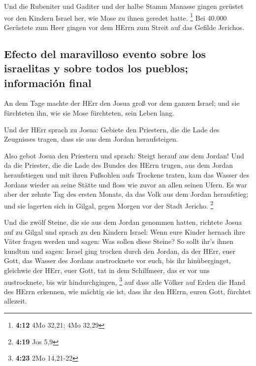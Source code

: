  Und die Rubeniter und Gaditer und der halbe Stamm
Manasse gingen gerüstet vor den Kindern Israel her, wie Mose zu ihnen
geredet hatte. \footnote{\textbf{4:12} 4Mo 32,21; 4Mo 32,29}
 Bei 40.000 Gerüstete zum Heer gingen vor dem HErrn zum
Streit auf das Gefilde Jerichos.

\hypertarget{efecto-del-maravilloso-evento-sobre-los-israelitas-y-sobre-todos-los-pueblos-informaciuxf3n-final}{%
\subsection{Efecto del maravilloso evento sobre los israelitas y sobre
todos los pueblos; información
final}\label{efecto-del-maravilloso-evento-sobre-los-israelitas-y-sobre-todos-los-pueblos-informaciuxf3n-final}}

 An dem Tage machte der HErr den Josua groß vor dem
ganzen Israel; und sie fürchteten ihn, wie sie Mose fürchteten, sein
Leben lang.

 Und der HErr sprach zu Josua:  Gebiete
den Priestern, die die Lade des Zeugnisses tragen, dass sie aus dem
Jordan heraufsteigen.

 Also gebot Josua den Priestern und sprach: Steigt herauf
aus dem Jordan!  Und da die Priester, die die Lade des
Bundes des HErrn trugen, aus dem Jordan heraufstiegen und mit ihren
Fußsohlen aufs Trockene traten, kam das Wasser des Jordans wieder an
seine Stätte und floss wie zuvor an allen seinen Ufern. 
Es war aber der zehnte Tag des ersten Monats, da das Volk aus dem Jordan
heraufstieg; und sie lagerten sich in Gilgal, gegen Morgen vor der Stadt
Jericho. \footnote{\textbf{4:19} Jos 5,9}

 Und die zwölf Steine, die sie aus dem Jordan genommen
hatten, richtete Josua auf zu Gilgal  und sprach zu den
Kindern Israel: Wenn eure Kinder hernach ihre Väter fragen werden und
sagen: Was sollen diese Steine?  So sollt ihr's ihnen
kundtun und sagen: Israel ging trocken durch den Jordan, 
da der HErr, euer Gott, das Wasser des Jordans austrocknete vor euch,
bis ihr hinüberginget, gleichwie der HErr, euer Gott, tat in dem
Schilfmeer, das er vor uns austrocknete, bis wir hindurchgingen,
\footnote{\textbf{4:23} 2Mo 14,21-22}  auf dass alle
Völker auf Erden die Hand des HErrn erkennen, wie mächtig sie ist, dass
ihr den HErrn, euren Gott, fürchtet allezeit.

